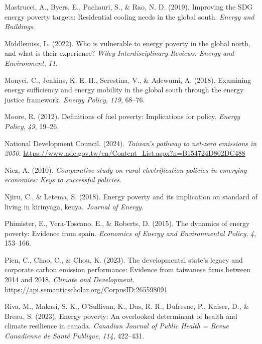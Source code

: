 \documentclass[
  twoside,
  openright,
  degree    = master,               %
  language  = english,              %
  fontset   = overleaf,             %
  watermark = true,                 %
  doi       = true,                 %
]{ntuthesis}
\newlength{\cslhangindent}
\newlength{\cslentryspacingunit} %
\newenvironment{CSLReferences}[2] %
 {%
  \setlength{\parindent}{0pt}
  \ifodd #1
  \let\oldpar\par
  \def\par{\hangindent=\cslhangindent\oldpar}
  \fi
  \setlength{\parskip}{#2\cslentryspacingunit}
 }%
 {}
\begin{document}
\begin{CSLReferences}{1}{0}
\leavevmode{}%
Mastrucci, A., Byers, E., Pachauri, S., \& Rao, N. D. (2019). Improving
the SDG energy poverty targets: Residential cooling needs in the global
south. \emph{Energy and Buildings}.

\leavevmode{}%
Middlemiss, L. (2022). Who is vulnerable to energy poverty in the global
north, and what is their experience? \emph{Wiley Interdisciplinary
Reviews: Energy and Environment}, \emph{11}.

\leavevmode{}%
Monyei, C., Jenkins, K. E. H., Serestina, V., \& Adewumi, A. (2018).
Examining energy sufficiency and energy mobility in the global south
through the energy justice framework. \emph{Energy Policy}, \emph{119},
68--76.

\leavevmode{}%
Moore, R. (2012). Definitions of fuel poverty: Implications for policy.
\emph{Energy Policy}, \emph{49}, 19--26.

\leavevmode{}%
National Development Council. (2024). \emph{Taiwan's pathway to net-zero
emissions in 2050}.
\url{https://www.ndc.gov.tw/en/Content_List.aspx?n=B154724D802DC488}

\leavevmode{}%
Niez, A. (2010). \emph{Comparative study on rural electrification
policies in emerging economies: Keys to successful policies}.

\leavevmode{}%
Njiru, C., \& Letema, S. (2018). Energy poverty and its implication on
standard of living in kirinyaga, kenya. \emph{Journal of Energy}.

\leavevmode{}%
Phimister, E., Vera-Toscano, E., \& Roberts, D. (2015). The dynamics of
energy poverty: Evidence from spain. \emph{Economics of Energy and
Environmental Policy}, \emph{4}, 153--166.

\leavevmode{}%
Pien, C., Chao, C., \& Chou, K. (2023). The developmental state's legacy
and corporate carbon emission performance: Evidence from taiwanese firms
between 2014 and 2018. \emph{Climate and Development}.
\url{https://api.semanticscholar.org/CorpusID:265598091}

\leavevmode{}%
Riva, M., Makasi, S. K., O'Sullivan, K., Das, R. R., Dufresne, P.,
Kaiser, D., \& Breau, S. (2023). Energy poverty: An overlooked
determinant of health and climate resilience in canada. \emph{Canadian
Journal of Public Health = Revue Canadienne de Santé Publique},
\emph{114}, 422--431.


\end{CSLReferences}
\end{document}

